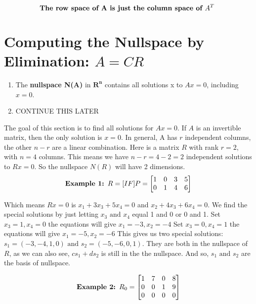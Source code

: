 \[
    \text{\textbf{The row space of A is just the column space of \(A^T\) }}
\]  



\section{Computing the Nullspace by Elimination: \(A = CR\) }

\begin{enumerate}
    \item The \textbf{nullspace N(A)} in \(\mathbf{R^n}\) contains all solutions x to \(Ax = 0\), including \(x = 0\).
    \item CONTINUE THIS LATER      
\end{enumerate}

The goal of this section is to find all solutions for \(Ax = 0\). 
If \(A\) is an invertible matrix, then the only solution is \(x = 0\). In general, A has \(r\)  independent columns, the other \(n - r\) are a linear combination. 
\newline
Here is a matrix \(R\) with rank \(r = 2\), with \(n = 4\) columns. This means we have \(n - r = 4 - 2 = 2\) independent solutions to \(Rx = 0\). So the nullspace \(N(R)\) will have 2 dimensions.
\[
    \text{\textbf{Example 1: }}
    R = [I F] P = \begin{bmatrix}
        1 & 0 & 3 & 5  \\
        0 & 1 & 4 & 6  \\
    \end{bmatrix}
\]

Which means \(Rx = 0\) is \(x_1 + 3x_3 + 5x_4 = 0\) and \(x_2 + 4x_3 + 6x_4 = 0\).
We find the special solutions by just letting \(x_3 \text{ and } x_4\) equal 1 and 0 or 0 and 1.
Set \(x_3 = 1, x_4 = 0\) the equations will give \(x_1 = -3, x_2 = -4\)    
Set \(x_3 = 0, x_4 = 1\) the equations will give \(x_1 = -5, x_2 = -6\)
This gives us two special solutions: \(s_1 = (-3, -4, 1, 0) \text{ and } s_2 = (-5, -6, 0, 1)\). They are both in the nullspace of \(R\), as we can also see, \(cs_1 + ds_2\) is still in the the nullspace. And so, \(s_1 \text{ and } s_2\) are the basis of nullspace.

\[
    \text{\textbf{Example 2: }} 
    R_0 =
    \begin{bmatrix}
        1 & 7 & 0 & 8  \\
        0 & 0 & 1 & 9  \\
        0 & 0 & 0 & 0  \\
    \end{bmatrix}
\]

